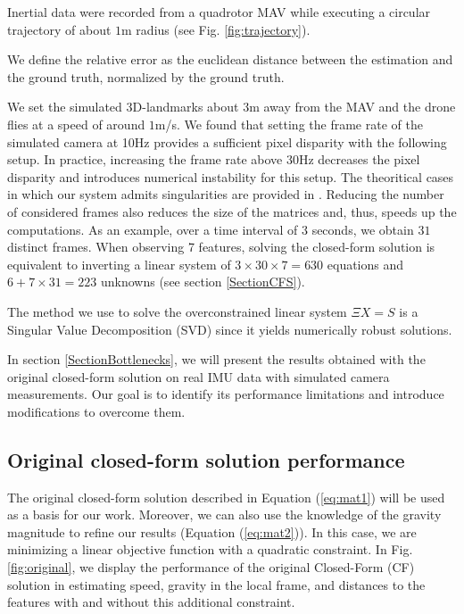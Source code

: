 \documentclass[letterpaper, 10 pt, journal, final]{ieeeconf}  %
\begin{document}
Inertial data were recorded from a quadrotor MAV while executing a circular trajectory of about $1$m radius (see Fig. \ref{fig:trajectory}).

We define the relative error as the euclidean distance between the estimation and the ground truth,
normalized by the ground truth.

We set the simulated 3D-landmarks about $3$m away from the MAV and the drone flies at a speed of around $1$m/s.
We found that setting the frame rate of the simulated camera at 10Hz provides a sufficient pixel disparity with the following setup.
In practice, increasing the frame rate above 30Hz decreases the pixel disparity and introduces numerical instability for this setup.
The theoritical cases in which our system admits singularities are provided in \cite{Martinelli2012}\cite{Martinelli2014}.
Reducing the number of considered frames also reduces the size of the matrices and, thus, speeds up the computations.
As an example, over a time interval of 3 seconds, we obtain $31$ distinct frames.
When observing 7 features, solving the closed-form solution is equivalent to inverting a linear system of $3\times 30\times 7 = 630$ equations and $6+7\times 31=223$ unknowns (see section \ref{SectionCFS}).

The method we use to solve the overconstrained linear system $\Xi X = S$ is a Singular Value Decomposition (SVD) since it yields numerically robust solutions.

In section \ref{SectionBottlenecks}, we will present the results obtained with the original closed-form solution on real IMU data with simulated camera measurements.
Our goal is to identify its performance limitations and introduce modifications to overcome them.



\subsection{Original closed-form solution performance}

The original closed-form solution described in Equation (\ref{eq:mat1}) will be used as a basis for our work.
Moreover, we can also use the knowledge of the gravity magnitude to refine our results (Equation (\ref{eq:mat2})).
In this case, we are minimizing a linear objective function with a quadratic constraint.
In Fig. \ref{fig:original}, we display the performance of the original Closed-Form (CF) solution in estimating speed, gravity in the local frame, and distances to the features with and without this additional constraint.
\end{document}
